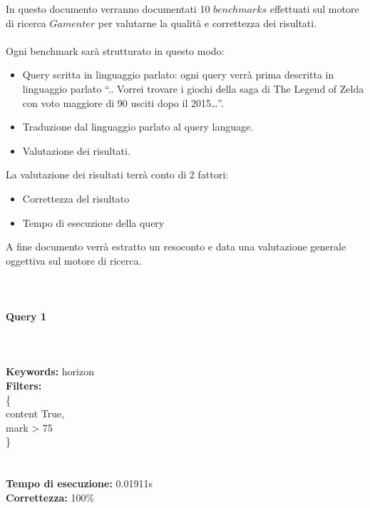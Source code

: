 \documentclass[12pt]{book}
\begin{document}
 \noindent
In questo documento verranno documentati 10 $benchmarks$ effettuati sul motore di ricerca $Gamenter$ per valutarne la qualità e correttezza dei risultati.
\\ \\
Ogni benchmark sarà strutturato in questo modo:
\begin{itemize}
	\item Query scritta in linguaggio parlato: ogni query verrà prima descritta in linguaggio parlato “.. Vorrei trovare i giochi della saga di The Legend of Zelda con voto maggiore di 90 usciti dopo il 2015…”.
	
	\item Traduzione dal linguaggio parlato al query language.
	
	\item Valutazione dei risultati.

\end{itemize}

\noindent La valutazione dei risultati terrà conto di 2 fattori:

\begin{itemize}
	\item Correttezza del risultato
	\item Tempo di esecuzione della query
\end{itemize}

\noindent A fine documento verrà estratto un resoconto e data una valutazione generale oggettiva sul motore di ricerca.
\\\\\\

\paragraph{Query 1} ~ \\ \\

\noindent \textbf{Keywords: } horizon \\
\textbf{Filters: } \\
	\indent \{ \\
 	\indent \indent content True, \\
 	\indent \indent mark > 75 \\
 	\indent \} \\\\\\
 	

\noindent
\textbf{Tempo di esecuzione:} 0.01911s \\
\textbf{Correttezza:} 100\%
\end{document}
